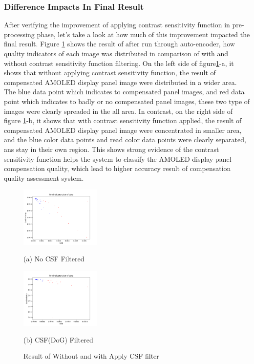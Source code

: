 \documentclass{article}
\begin{document}
\subsubsection{Difference Impacts In Final Result}
After verifying the improvement of applying contrast sensitivity function in pre-processing phase, let's take a look at how much of this improvement impacted the final result. Figure \ref{fig4} shows the result of after run through auto-encoder, how quality indicators of each image was distributed in comparison of with and without contrast sensitivity function filtering.  On the left side of figure\ref{fig4}-a, it shows that without applying contrast sensitivity function, the result of compensated AMOLED display panel image were distributed in a wider area. The blue data point which indicates to compensated panel images, and red data point which indicates to badly or no compensated panel images, these two type of images were clearly spreaded in the all area. In contrast, on the right side of figure \ref{fig4}-b, it shows that with contrast sensitivity function applied, the result of compensated AMOLED display panel image were concentrated in smaller area, and the blue color data points and read color data points were clearly separated, ans stay in their own region. This shows strong evidence of the contrast sensitivity function helps the system to classify the AMOLED display panel compensation quality, which lead to higher accuracy result of compensation quality assessment system.   

\begin{figure}[h]
\begin{minipage}[b]{0.48\linewidth}
  \centering
  \centerline{\includegraphics[width=4.0cm]{images/1440P_NoCSFed_0r_123b_result.png}}
  \centerline{(a) No CSF Filtered}\medskip
\end{minipage}
\hfill
\begin{minipage}[b]{0.48\linewidth}
  \centering
  \centerline{\includegraphics[width=4.0cm]{images/1440P_CSFed_0r_123b_result.png}}
  \centerline{(b)  CSF(DoG) Filtered}\medskip
\end{minipage}
%
\caption{Result of Without and with Apply CSF filter}
\label{fig4}
%
\end{figure}
\end{document}
